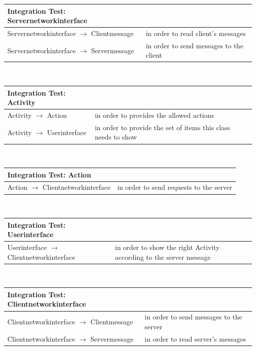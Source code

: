 \vspace{5mm}
\begin{tabular*}{1.21\textwidth}{ l p{7cm}}
\textbf{Integration Test}: Servernetworkinterface		&  \\
 \hline
 Servernetworkinterface $\rightarrow$ Clientmessage &  in order to read client's messages \\  
 \hline
 Servernetworkinterface $\rightarrow$ Servermessage &  in order to send messages to the client\\
 \hline
\end{tabular*}\\

\vspace{5mm} 
\begin{tabular*}{1.21\textwidth}{ l p{7cm}}
 \textbf{Integration Test}: Activity	&  \\
 \hline
 Activity $\rightarrow$ Action &  in order to provides the allowed actions \\  
 \hline
 Activity $\rightarrow$ Userinterface & in order to provide the set of items this class needs to show\\
 \hline
 \end{tabular*}\\

\vspace{5mm}
 \begin{tabular*}{1.21\textwidth}{ l p{7cm}}
 \textbf{Integration Test}: Action		&  \\
 \hline
 Action $\rightarrow$ Clientnetworkinterface &  in order to send requests to the server \\    
 \hline
\end{tabular*}\\

\vspace{5mm}
 \begin{tabular*}{1.21\textwidth}{ l p{7cm}}
 \textbf{Integration Test}: Userinterface		&  \\
 \hline
 Userinterface $\rightarrow$ Clientnetworkinterface &  in order to show the right Activity according to the server message \\    
 \hline
\end{tabular*}\\

\vspace{5mm}
\begin{tabular*}{1.21\textwidth}{ l p{7cm}}
\textbf{Integration Test}: Clientnetworkinterface	&  \\
 \hline
 Clientnetworkinterface $\rightarrow$ Clientmessage & in order to send messages to the server  \\ 
 \hline
Clientnetworkinterface $\rightarrow$ Servermessage &   in order to read server's messages\\   
 \hline
\end{tabular*}

